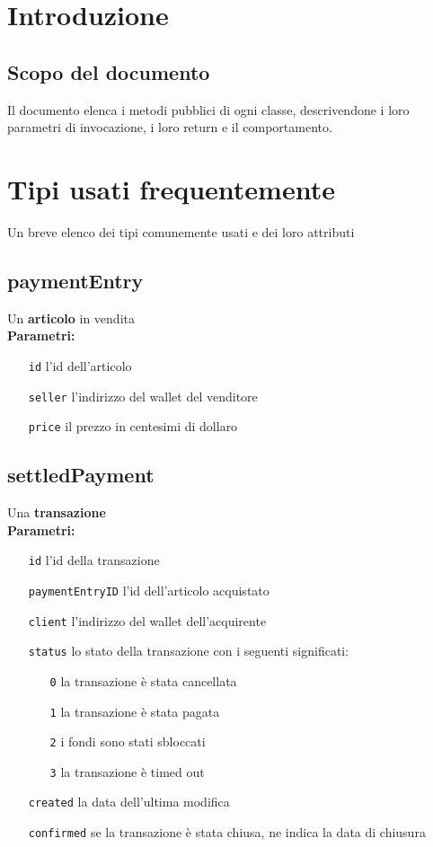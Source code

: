 \documentclass[a4paper, 12pt]{article}
\begin{document}
\makefrontpage

\makeversioni

\section{Introduzione}
\subsection{Scopo del documento}
Il documento elenca i metodi pubblici di ogni classe, descrivendone i loro parametri di invocazione, i loro return e il comportamento.

\section{Tipi usati frequentemente}\label{tipi}
Un breve elenco dei tipi comunemente usati e dei loro attributi

\subsection{paymentEntry}
Un \textbf{articolo} in vendita\\
\textbf{Parametri:}
\begin{itemize}
\item[\texttt{id}]	l'id dell'articolo
\item[\texttt{seller}] l'indirizzo del wallet del venditore
\item[\texttt{price}] il prezzo in centesimi di dollaro
\end{itemize}

\subsection{settledPayment}
Una \textbf{transazione}\\
\textbf{Parametri:}
\begin{itemize}
\item[\texttt{id}]	l'id della transazione
\item[\texttt{paymentEntryID}]	l'id dell'articolo acquistato
\item[\texttt{client}] l'indirizzo del wallet dell'acquirente
\item[\texttt{status}] lo stato della transazione con i seguenti significati:
	\begin{itemize}
	\item[\texttt{0}] la transazione è stata cancellata
	\item[\texttt{1}] la transazione è stata pagata
	\item[\texttt{2}] i fondi sono stati sbloccati
	\item[\texttt{3}] la transazione è timed out
	\end{itemize}
\item[\texttt{created}] la data dell'ultima modifica
\item[\texttt{confirmed}] se la transazione è stata chiusa, ne indica la data di chiusura
\end{itemize}
\end{document}
